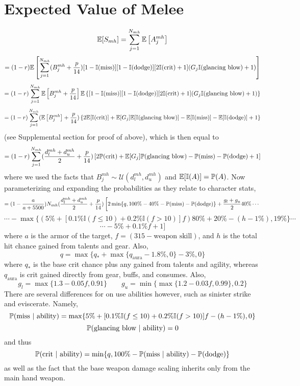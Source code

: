 \section*{Expected Value of Melee}
%
$$
\E[S_{mh}] = \sum_{j=1}^{N_{mh}} \E \left[ A_j^{mh} \right]
$$
$$
= (1 - r) \E \left[ \sum_{j=1}^{N_{mh}} (B_j^{mh} + \frac{p}{14}) [1 - \mathbb{I}(\text{miss})] [1 - \mathbb{I}(\text{dodge})] [2 \mathbb{I}(\text{crit}) + 1] (G_j \mathbb{I}(\text{glancing blow}) + 1) \right]
$$
$$
= (1 - r) \sum_{j=1}^{N_{mh}} \E \left[ B_j^{mh} + \frac{p}{14} \right] \E \left\{ [1 - \mathbb{I}(\text{miss})] [1 - \mathbb{I}(\text{dodge})] [2 \mathbb{I}(\text{crit}) + 1] (G_j \mathbb{I}(\text{glancing blow}) + 1) \right\}
$$
$$
= (1 - r) \sum_{j=1}^{N_{mh}} (\E \left[ B_j^{mh} \right] + \frac{p}{14}) \left\{ 2 \E[ \mathbb{I}(\text{crit})] + \E[G_j] \E[\mathbb{I}(\text{glancing blow})] - \E[\mathbb{I}(\text{miss})] - \E[\mathbb{I}(\text{dodge})] + 1 \right\}
$$
%
(see Supplemental section for proof of above), which is then equal to
%
$$
= (1 - r) \sum_{j=1}^{N_{mh}} (\frac{d_l^{mh} + d_u^{mh}}{2} + \frac{p}{14}) \left[ 2 \P(\text{crit}) + \E[G_j] \P(\text{glancing blow}) - \P(\text{miss}) - \P(\text{dodge}) + 1 \right]
$$
%
where we used the facts that $B_j^{mh} \sim \mathcal{U}(d_l^{mh}, d_u^{mh})$ and $\E[\mathbb{I}(A)] = \P(A)$. Now parameterizing and expanding the probabilities as they relate to character stats,
%
$$
= (1 - \frac{a}{a + 5500}) N_{mh} (\frac{d_l^{mh} + d_u^{mh}}{2} + \frac{p}{14}) \left[ 2 \min\{q, 100\% - 40\% - \P(\text{miss}) - \P(\text{dodge}) \} + \frac{g_l + g_u}{2} 40\% \cdots \right.
$$
$$
\left. \cdots - \max\{ (5\% + [0.1\% \mathbb{I}(f \leq 10) + 0.2\% \mathbb{I}(f > 10)] f) 80\% + 20\% - (h - 1\%), 19\% \} \cdots \right.
$$
$$
\left. \cdots - 5\% + 0.1\% f + 1 \bigg] \right.
$$
%
where $a$ is the armor of the target, $f = (315 - \text{weapon skill})$, and $h$ is the total hit chance gained from talents and gear. Also,
%
$$
q = \max\{ q_* + \max\{q_\text{aura} - 1.8\%, 0\} - 3\%, 0 \}
$$
%
where $q_*$ is the base crit chance plus any gained from talents and agility, whereas $q_\text{aura}$ is crit gained directly from gear, buffs, and consumes. Also,
%
$$
g_l = \max\{1.3 - 0.05 f, 0.91\}
\qquad
g_u = \min\{ \max\{ 1.2 - 0.03 f, 0.99 \}, 0.2 \}
$$
%
There are several differences for on use abilities however, such as sinister strike and eviscerate. Namely,
%
$$
\P(\text{miss} \ | \ \text{ability}) = \max\{ 5\% + [0.1\% \mathbb{I}(f \leq 10) + 0.2\% \mathbb{I}(f > 10)] f - (h - 1\%), 0 \}
$$
$$
\P(\text{glancing blow} \ | \ \text{ability}) = 0
$$
%
and thus
%
$$
\P(\text{crit} \ | \ \text{ability}) = \min\{q, 100\% - \P(\text{miss} \ | \ \text{ability}) - \P(\text{dodge}) \}
$$
%
as well as the fact that the base weapon damage scaling inherits only from the main hand weapon.




